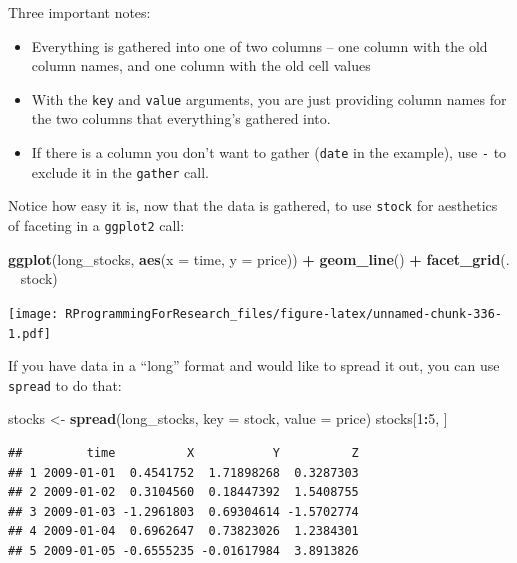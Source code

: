 \documentclass[]{book}
\makeatletter
\newenvironment{Shaded}{\begin{snugshade}}{\end{snugshade}}
\newcommand{\KeywordTok}[1]{\textcolor[rgb]{0.13,0.29,0.53}{\textbf{#1}}}
\newcommand{\DataTypeTok}[1]{\textcolor[rgb]{0.13,0.29,0.53}{#1}}
\newcommand{\DecValTok}[1]{\textcolor[rgb]{0.00,0.00,0.81}{#1}}
\newcommand{\StringTok}[1]{\textcolor[rgb]{0.31,0.60,0.02}{#1}}
\newcommand{\OperatorTok}[1]{\textcolor[rgb]{0.81,0.36,0.00}{\textbf{#1}}}
\newcommand{\NormalTok}[1]{#1}
\providecommand{\tightlist}{%
  \setlength{\itemsep}{0pt}\setlength{\parskip}{0pt}}
\newenvironment{kframe}{%
\medskip{}
\setlength{\fboxsep}{.8em}
 \def\at@end@of@kframe{}%
 \ifinner\ifhmode%
  \def\at@end@of@kframe{\end{minipage}}%
  \begin{minipage}{\columnwidth}%
 \fi\fi%
 \def\FrameCommand##1{\hskip\@totalleftmargin \hskip-\fboxsep
 \colorbox{shadecolor}{##1}\hskip-\fboxsep
     \hskip-\linewidth \hskip-\@totalleftmargin \hskip\columnwidth}%
 \MakeFramed {\advance\hsize-\width
   \@totalleftmargin\z@ \linewidth\hsize
   \@setminipage}}%
 {\par\unskip\endMakeFramed%
 \at@end@of@kframe}
\renewenvironment{Shaded}{\begin{kframe}}{\end{kframe}}
\theoremstyle{definition}
\theoremstyle{definition}
\theoremstyle{definition}
\theoremstyle{remark}
\makeatother
\begin{document}
Three important notes:

\begin{itemize}
\tightlist
\item
  Everything is gathered into one of two columns -- one column with the
  old column names, and one column with the old cell values
\item
  With the \texttt{key} and \texttt{value} arguments, you are just
  providing column names for the two columns that everything's gathered
  into.
\item
  If there is a column you don't want to gather (\texttt{date} in the
  example), use \texttt{-} to exclude it in the \texttt{gather} call.
\end{itemize}

Notice how easy it is, now that the data is gathered, to use
\texttt{stock} for aesthetics of faceting in a \texttt{ggplot2} call:

\begin{Shaded}
\begin{Highlighting}[]
\KeywordTok{ggplot}\NormalTok{(long_stocks, }\KeywordTok{aes}\NormalTok{(}\DataTypeTok{x =}\NormalTok{ time, }\DataTypeTok{y =}\NormalTok{ price)) }\OperatorTok{+}\StringTok{ }
\StringTok{  }\KeywordTok{geom_line}\NormalTok{() }\OperatorTok{+}\StringTok{ }
\StringTok{  }\KeywordTok{facet_grid}\NormalTok{(. }\OperatorTok{~}\StringTok{ }\NormalTok{stock)}
\end{Highlighting}
\end{Shaded}

\texttt{[image: RProgrammingForResearch\_files/figure-latex/unnamed-chunk-336-1.pdf]}

If you have data in a ``long'' format and would like to spread it out,
you can use \texttt{spread} to do that:

\begin{Shaded}
\begin{Highlighting}[]
\NormalTok{stocks <-}\StringTok{ }\KeywordTok{spread}\NormalTok{(long_stocks, }\DataTypeTok{key =}\NormalTok{ stock, }\DataTypeTok{value =}\NormalTok{ price)}
\NormalTok{stocks[}\DecValTok{1}\OperatorTok{:}\DecValTok{5}\NormalTok{, ]}
\end{Highlighting}
\end{Shaded}

\begin{verbatim}
##         time          X           Y          Z
## 1 2009-01-01  0.4541752  1.71898268  0.3287303
## 2 2009-01-02  0.3104560  0.18447392  1.5408755
## 3 2009-01-03 -1.2961803  0.69304614 -1.5702774
## 4 2009-01-04  0.6962647  0.73823026  1.2384301
## 5 2009-01-05 -0.6555235 -0.01617984  3.8913826
\end{verbatim}
\end{document}
